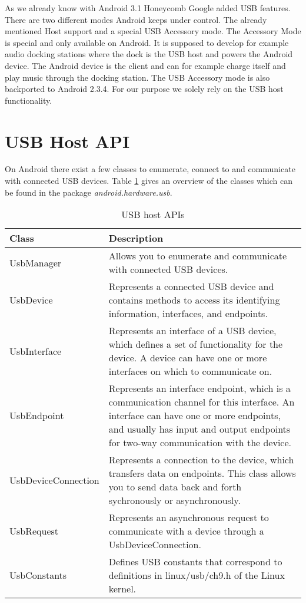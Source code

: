 As we already know with Android 3.1 Honeycomb Google added USB features. There are two different modes Android keeps under control. The already mentioned Host support and a special USB Accessory mode\cite{android_usb_accessory}. The Accessory Mode is special and only available on Android. It is supposed to develop for example audio docking stations where the dock is the USB host and powers the Android device. The Android device is the client and can for example charge itself and play music through the docking station. The USB Accessory mode is also backported to Android 2.3.4\cite{android_usb_accessory}. For our purpose we solely rely on the USB host functionality.

\section{USB Host API}

On Android there exist a few classes to enumerate, connect to and communicate with connected USB devices. Table \ref{table:host_api} gives an overview of the classes which can be found in the package \textit{android.hardware.usb}.

\begin{table}[ht]
\caption{USB host APIs \cite{android_usb_host}}
\centering
\begin{tabular}{|l|p{10cm}|}
\hline\hline
\textbf{Class} & \textbf{Description} \\ \hline
UsbManager & Allows you to enumerate and communicate with connected USB devices. \\ \hline
UsbDevice & Represents a connected USB device and contains methods to access its identifying information, interfaces, and endpoints. \\ \hline
UsbInterface & Represents an interface of a USB device, which defines a set of functionality for the device. A device can have one or more interfaces on which to communicate on. \\ \hline
UsbEndpoint & Represents an interface endpoint, which is a communication channel for this interface. An interface can have one or more endpoints, and usually has input and output endpoints for two-way communication with the device. \\ \hline
UsbDeviceConnection & Represents a connection to the device, which transfers data on endpoints. This class allows you to send data back and forth sychronously or asynchronously. \\ \hline
UsbRequest & Represents an asynchronous request to communicate with a device through a UsbDeviceConnection. \\ \hline
UsbConstants & Defines USB constants that correspond to definitions in linux/usb/ch9.h of the Linux kernel. \\ \hline
\end{tabular}
\label{table:host_api}
\end{table}

